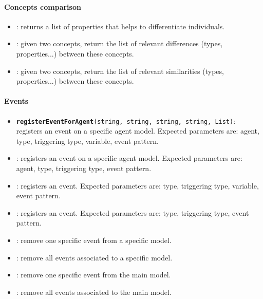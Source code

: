 \paragraph{Concepts comparison}
\begin{itemize}

    \item {}: returns a list of properties that
    helps to differentiate individuals.

    \item {}: given two concepts,
    return the list of relevant differences (types, properties...) between
    these concepts.

    \item {}: given two concepts,
    return the list of relevant similarities (types, properties...) between
    these concepts.
\end{itemize}

\paragraph{Events}
\begin{itemize}

    \item {\tt {\bf registerEventForAgent}(string, string, string, string,
    List)}: registers an event on a specific agent model. Expected parameters
    are: agent, type, triggering type, variable, event pattern.

    \item {}:
    registers an event on a specific agent model. Expected parameters are:
    agent, type, triggering type, event pattern.

    \item {}: registers an
    event. Expected parameters are: type, triggering type, variable, event
    pattern.

    \item {}: registers an event.
    Expected parameters are: type, triggering type, event pattern.

    \item {}: remove one specific event
    from a specific model.

    \item {}: remove all events associated
    to a specific model.

    \item {}: remove one specific event from the
    main model.

    \item {}: remove all events associated to the main
    model.
\end{itemize}

